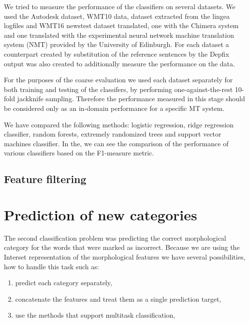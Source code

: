 We tried to measure the performance of the classifiers on several datasets. We used
the Autodesk dataset, WMT10 data, dataset extracted from the lingea logfiles and
WMT16 newstest dataset translated, one with the Chimera system and
one translated with the experimental neural network machine translation system (NMT)
provided by the University of Edinburgh. For each dataset a counterpart
created by substitution of the reference sentences by the Depfix output was also created
to additionally measure the performance on the  data.

For the purposes of the coarse evaluation we used each dataset separately for both training
and testing of the classifers, by performing one-against-the-rest 10-fold jackknife sampling.
Therefore the performance measured in this stage should be considered only as an in-domain
performance for a specific MT system.

We have compared the following methods: logistic regression, ridge regression classifier,
random forests, extremely randomized trees and support vector machines classifier.
In the, we can see the comparison of the performance of various classifiers based
on the F1-measure metric. %





\subsection{Feature filtering}



\section{Prediction of new categories}

The second classification problem was predicting the correct morphological category for
the words that were marked as incorrect. Because we are using the Interset representation
of the morphological features we have several possibilities, how to handle this task such
as:
\begin{enumerate}
    \item predict each category separately,
    \item concatenate the features and treat them as a single prediction target,
    \item use the methods that support multitask classification,
\end{enumerate}

